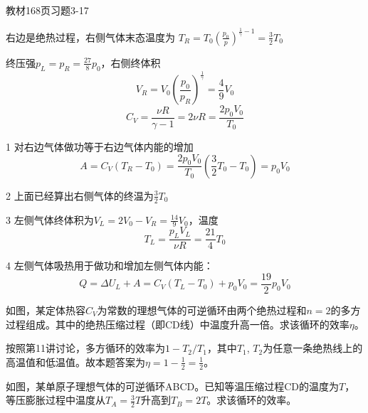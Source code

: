 \documentclass[CJK]{beamer}
\begin{document}
\begin{frame}
  \bch
  教材168页习题3-17
  \ech
\end{frame}

\begin{frame}
  \bch
  {\scriptsize
    右边是绝热过程，右侧气体末态温度为
    $T_R = T_0\left(\frac{p_0}{p}\right)^{\frac{1}{\gamma}-1} = \frac{3}{2}T_0$
    
    终压强$p_L=p_R=\frac{27}{8}p_0$，右侧终体积
    $$V_R = V_0\left(\frac{p_0}{p_R}\right)^{\frac{1}{\gamma}} = \frac{4}{9}V_0$$
    $$C_V = \frac{\nu R}{\gamma - 1} = 2 \nu R = \frac{2p_0V_0}{T_0}$$
  
    \bitem
  \item[1]{对右边气体做功等于右边气体内能的增加
    $$A = C_V(T_R-T_0) = \frac{2p_0V_0}{T_0}\left(\frac{3}{2}T_0-T_0\right) = p_0V_0$$}
  \item[2]{上面已经算出右侧气体的终温为$\frac{3}{2}T_0$}
  \item[3]{左侧气体终体积为$V_L=2V_0-V_R = \frac{14}{9}V_0$，温度
    $$T_L = \frac{p_LV_L}{\nu R} = \frac{21}{4}T_0$$}
  \item[4]{左侧气体吸热用于做功和增加左侧气体内能：
    $$ Q = \Delta U_L + A = C_V(T_L-T_0) + p_0V_0 = \frac{19}{2}p_0V_0$$}
    \eitem
  }
  \ech
\end{frame}

\begin{frame}
  \bch

  如图，某定体热容$C_V$为常数的理想气体的可逆循环由两个绝热过程和$n=2$的多方过程组成。其中的绝热压缩过程（即CD线）中温度升高一倍。求该循环的效率$\eta$。
  \ech
\end{frame}

\begin{frame}
  \bch
  按照第11讲讨论，多方循环的效率为$1-T_2/T_1$，其中$T_1$, $T_2$为任意一条绝热线上的高温值和低温值。故本题答案为$\eta = 1 - \frac{1}{2} = \frac{1}{2}$。
  \ech
\end{frame}

\begin{frame}
  \bch

  如图，某单原子理想气体的可逆循环ABCD。已知等温压缩过程CD的温度为$T$，等压膨胀过程中温度从$T_A=\frac{3}{2}T$升高到$T_B=2T$。求该循环的效率。
  
  \ech
\end{frame}
\end{document}
